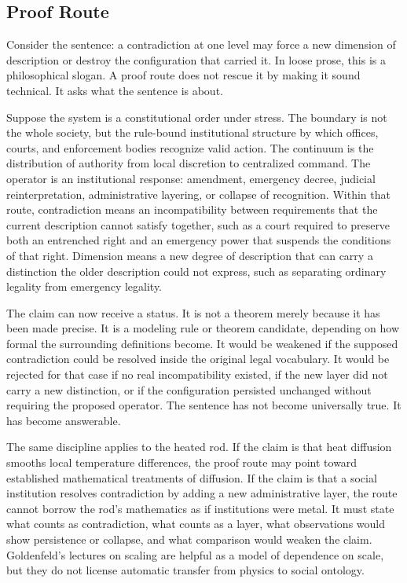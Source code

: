\documentclass[11pt,a4paper,openany]{book}
\begin{document}
\subsection{Proof Route}
Consider the sentence: a contradiction at one level may force a new dimension of description or destroy the configuration that carried it. In loose prose, this is a philosophical slogan. A proof route does not rescue it by making it sound technical. It asks what the sentence is about. \cite{goldenfeld_lectures,kadanoff_scaling}\par
Suppose the system is a constitutional order under stress. The boundary is not the whole society, but the rule-bound institutional structure by which offices, courts, and enforcement bodies recognize valid action. The continuum is the distribution of authority from local discretion to centralized command. The operator is an institutional response: amendment, emergency decree, judicial reinterpretation, administrative layering, or collapse of recognition. Within that route, contradiction means an incompatibility between requirements that the current description cannot satisfy together, such as a court required to preserve both an entrenched right and an emergency power that suspends the conditions of that right. Dimension means a new degree of description that can carry a distinction the older description could not express, such as separating ordinary legality from emergency legality.\par
The claim can now receive a status. It is not a theorem merely because it has been made precise. It is a modeling rule or theorem candidate, depending on how formal the surrounding definitions become. It would be weakened if the supposed contradiction could be resolved inside the original legal vocabulary. It would be rejected for that case if no real incompatibility existed, if the new layer did not carry a new distinction, or if the configuration persisted unchanged without requiring the proposed operator. The sentence has not become universally true. It has become answerable.\par
The same discipline applies to the heated rod. If the claim is that heat diffusion smooths local temperature differences, the proof route may point toward established mathematical treatments of diffusion. If the claim is that a social institution resolves contradiction by adding a new administrative layer, the route cannot borrow the rod's mathematics as if institutions were metal. It must state what counts as contradiction, what counts as a layer, what observations would show persistence or collapse, and what comparison would weaken the claim. Goldenfeld's lectures on scaling are helpful as a model of dependence on scale, but they do not license automatic transfer from physics to social ontology.\par
\end{document}
